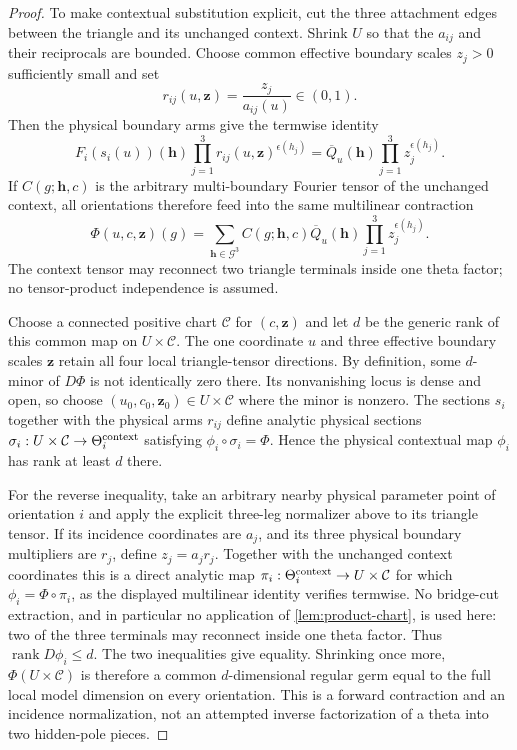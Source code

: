 \documentclass[11pt]{article}
\theoremstyle{remark}
\begin{document}
\begin{proof}
To make contextual substitution explicit, cut the three attachment edges
between the triangle and its unchanged context.  Shrink $U$ so that the
$a_{ij}$ and their
reciprocals are bounded.  Choose common effective boundary
scales $z_j>0$ sufficiently small and set
\[
r_{ij}(u,\mathbf z)=\frac{z_j}{a_{ij}(u)}\in(0,1).
\]
Then the physical boundary arms give the termwise identity
\[
F_i(s_i(u))(\mathbf h)
 \prod_{j=1}^3r_{ij}(u,\mathbf z)^{\epsilon(h_j)}
=\overline Q_u(\mathbf h)
 \prod_{j=1}^3z_j^{\epsilon(h_j)}.
\]
If $C(g;\mathbf h,c)$ is the arbitrary multi-boundary Fourier tensor of the
unchanged context, all orientations therefore feed into the same multilinear
contraction
\[
\Phi(u,c,\mathbf z)(g)=
\sum_{\mathbf h\in\mathcal G^3}
C(g;\mathbf h,c)\overline Q_u(\mathbf h)
\prod_{j=1}^3z_j^{\epsilon(h_j)}.
\]
The context tensor may reconnect two triangle terminals inside one theta
factor; no tensor-product independence is assumed.

Choose a connected positive chart $\mathcal C$ for $(c,\mathbf z)$ and let
$d$ be the generic rank of this common map on $U\times\mathcal C$.  The one
coordinate $u$ and three effective boundary scales $\mathbf z$ retain all four
local triangle-tensor directions.
By definition, some $d$-minor of
$D\Phi$ is not identically zero there.  Its nonvanishing locus is dense and
open, so choose $(u_0,c_0,\mathbf z_0)\in U\times\mathcal C$ where the
minor is nonzero.  The sections $s_i$ together with the physical arms
$r_{ij}$ define analytic physical sections
$\sigma_i:U\times\mathcal C\to\Theta_i^{\rm context}$ satisfying
$\phi_i\circ\sigma_i=\Phi$.  Hence the physical contextual map $\phi_i$ has
rank at least $d$ there.

For the reverse inequality, take an arbitrary nearby physical parameter point
of orientation $i$ and apply the explicit three-leg normalizer above to its
triangle tensor.  If its incidence coordinates are $a_j$, and its three
physical boundary multipliers are $r_j$, define $z_j=a_jr_j$.  Together with
the unchanged context coordinates this is a direct analytic map
$\pi_i:\Theta_i^{\rm context}\to U\times\mathcal C$ for which
$\phi_i=\Phi\circ\pi_i$, as the displayed multilinear identity verifies
termwise.  No bridge-cut extraction, and in particular no application of
\cref{lem:product-chart}, is used here: two of the three terminals may
reconnect inside one theta factor.  Thus
$\operatorname{rank}D\phi_i\le d$.  The two inequalities give equality.  Shrinking once
more, $\Phi(U\times\mathcal C)$ is therefore a common $d$-dimensional regular
germ equal to the full local model dimension on every orientation.  This is a
forward contraction and an incidence normalization, not an attempted inverse
factorization of a theta into two hidden-pole pieces.
\end{proof}
\end{document}
